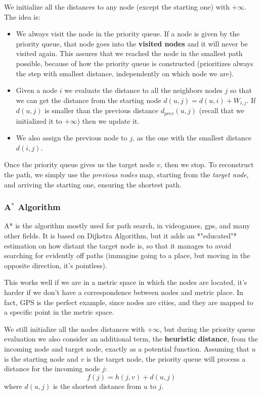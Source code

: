 \documentclass[12pt,a4paper]{article}
\begin{document}
We initialize all the distances to any node (except the starting one) with $+\infty$.
The idea is:

\begin{itemize}
	\item[1.] We always visit the node in the priority queue. If a node is given by the priority queue, that node goes into the \textbf{visited nodes} and it will never be visited again. This assures that we reached the node in the smallest path possible, because of how the priority queue is constructed (prioritizes always the step with smallest distance, independently on which node we are).
	\item[2.] Given a node $i$ we evaluate the distance to all the neighbors nodes $j$ so that we can get the distance from the starting node $d(u,j)=d(u,i)+W_{i,j}$. If $d(u,j)$ is smaller than the previous distance $d_{prev}(u,j)$ (recall that we initialized it to $+\infty$) then we update it.
	\item[3.] We also assign the previous node to $j$, as the one with the smallest distance $d(i,j)$.
	
\end{itemize}

Once the priority queue gives us the target node $v$, then we stop. To reconstruct the path, we simply use the \textit{previous nodes} map, starting from the \textit{target node}, and arriving the starting one, ensuring the shortest path.

\subsubsection*{A$^*$ Algorithm}
A* is the algorithm mostly used for path search, in videogames, gps, and many other fields. It is based on Dijkstra Algorithm, but it adds an *"educated"* estimation on how distant the target node is, so that it manages to avoid searching for evidently off paths (immagine going to a place, but moving in the opposite direction, it's pointless).

This works well if we are in a metric space in which the nodes are located, it's harder if we don't have a correspondence between nodes and metric place. In fact, GPS is the perfect example, since nodes are cities, and they are mapped to a specific point in the metric space.

We still initialize all the nodes distances with $+\infty$, but during the priority queue evaluation we also consider an additional term, the \textbf{heuristic distance}, from the incoming node and target node, exactly as a potential function. Assuming that $u$ is the starting node and $v$ is the target node, the priority queue will process a distance for the incoming node $j$:
$$
f(j) = h(j,v) + d(u,j)
$$
where $d(u,j)$ is the shortest distance from $u$ to $j$.
\end{document}
